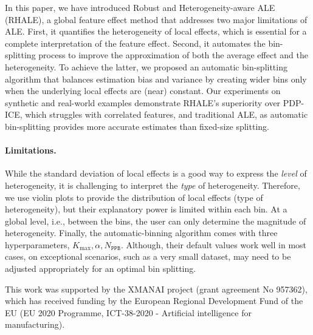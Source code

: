 \documentclass{ecai}  %
\newcommand{\paragraphb}{\vspace{-0.25cm}\paragraph}
\begin{document}
In this paper, we have introduced Robust and Heterogeneity-aware ALE (RHALE), a global feature effect method that addresses two major limitations of ALE. First, it quantifies the heterogeneity of local effects, which is essential for a complete interpretation of the feature effect. Second, it automates the bin-splitting process to improve the approximation of both the average effect and the heterogeneity. To achieve the latter, we proposed an automatic bin-splitting algorithm that balances estimation bias and variance by creating wider bins only when the underlying local effects are (near) constant. Our experiments on synthetic and real-world examples demonstrate RHALE's superiority over PDP-ICE, which struggles with correlated features, and traditional ALE, as automatic bin-splitting provides more accurate estimates than fixed-size splitting.

\paragraphb{Limitations.}
While the standard deviation of local effects is a good way to express the \textit{level} of heterogeneity, it is challenging to interpret the \textit{type} of heterogeneity. Therefore, we use violin plots to provide the distribution of local effects (type of heterogeneity), but their explanatory power is limited within each bin. At a global level, i.e., between the bins, the user can only determine the magnitude of heterogeneity. Finally, the automatic-binning algorithm comes with three hyperparameters, \(K_{\max}, \alpha, N_{\mathtt{PPB}}\). Although, their default values work well in most cases, on exceptional scenarios, such as a very small dataset, may need to be adjusted appropriately for an optimal bin splitting.

\clearpage

\ack

This work was supported by the XMANAI project (grant agreement No 957362), which has received funding by the European Regional Development Fund of the EU (EU 2020 Programme, ICT-38-2020 - Artificial intelligence for manufacturing).


\end{document}
